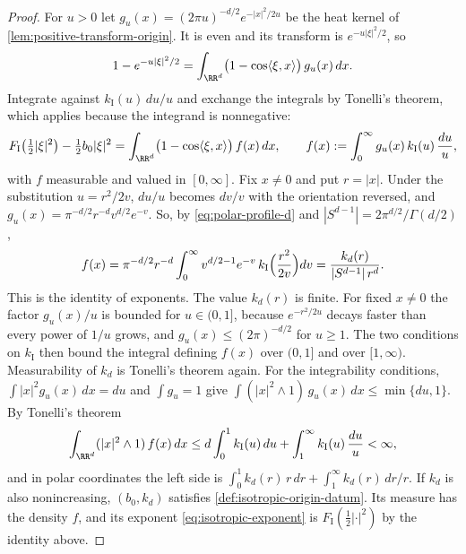 \begin{proof}
\leanok
For $u > 0$ let $g_u(x) = (2\pi u)^{-d/2}e^{-|x|^2/2u}$ be the heat kernel of
\ref{lem:positive-transform-origin}. It is even and its transform is $e^{-u|\xi|^2/2}$, so
\[
  1 - e^{-u|\xi|^2/2} = \int_{\RR^d}\bigl(1 - \cos\langle\xi,x\rangle\bigr)\,g_u(x)\,dx .
\]
Integrate against $k_{\mathrm I}(u)\,du/u$ and exchange the integrals by Tonelli's theorem, which
applies because the integrand is nonnegative:
\[
  F_{\mathrm I}\bigl(\tfrac12|\xi|^2\bigr) - \tfrac12 b_0|\xi|^2
   = \int_{\RR^d}\bigl(1 - \cos\langle\xi,x\rangle\bigr)\,f(x)\,dx ,
  \qquad f(x) := \int_0^\infty g_u(x)\,k_{\mathrm I}(u)\,\frac{du}{u} ,
\]
with $f$ measurable and valued in $[0,\infty]$. Fix $x \ne 0$ and put $r = |x|$. Under the
substitution $u = r^2/2v$, $du/u$ becomes $dv/v$ with the orientation reversed, and
$g_u(x) = \pi^{-d/2}r^{-d}v^{d/2}e^{-v}$. So, by \ref{eq:polar-profile-d} and
$|S^{d-1}| = 2\pi^{d/2}/\Gamma(d/2)$,
\[
  f(x) = \pi^{-d/2}r^{-d}\int_0^\infty v^{d/2-1}e^{-v}\,k_{\mathrm I}\Bigl(\frac{r^2}{2v}\Bigr)dv
   = \frac{k_d(r)}{|S^{d-1}|\,r^d} .
\]
This is the identity of exponents. The value $k_d(r)$ is finite. For fixed $x \ne 0$ the factor
$g_u(x)/u$ is bounded for $u \in (0,1]$, because $e^{-r^2/2u}$ decays faster than every power of
$1/u$ grows, and $g_u(x) \le (2\pi)^{-d/2}$ for $u \ge 1$. The two conditions on $k_{\mathrm I}$
then bound the integral defining $f(x)$ over $(0,1]$ and over $[1,\infty)$. Measurability of $k_d$
is Tonelli's theorem again. For the integrability conditions, $\int|x|^2g_u(x)\,dx = du$ and
$\int g_u = 1$ give $\int(|x|^2 \wedge 1)\,g_u(x)\,dx \le \min\{du, 1\}$. By Tonelli's theorem
\[
  \int_{\RR^d}(|x|^2 \wedge 1)\,f(x)\,dx \le d\int_0^1 k_{\mathrm I}(u)\,du
   + \int_1^\infty k_{\mathrm I}(u)\,\frac{du}{u} < \infty ,
\]
and in polar coordinates the left side is $\int_0^1 k_d(r)\,r\,dr + \int_1^\infty k_d(r)\,dr/r$.
If $k_d$ is also nonincreasing, $(b_0,k_d)$ satisfies \ref{def:isotropic-origin-datum}. Its
\Levy{} measure has the density $f$, and its exponent \ref{eq:isotropic-exponent} is
$F_{\mathrm I}(\tfrac12|\cdot|^2)$ by the identity above.
\end{proof}

